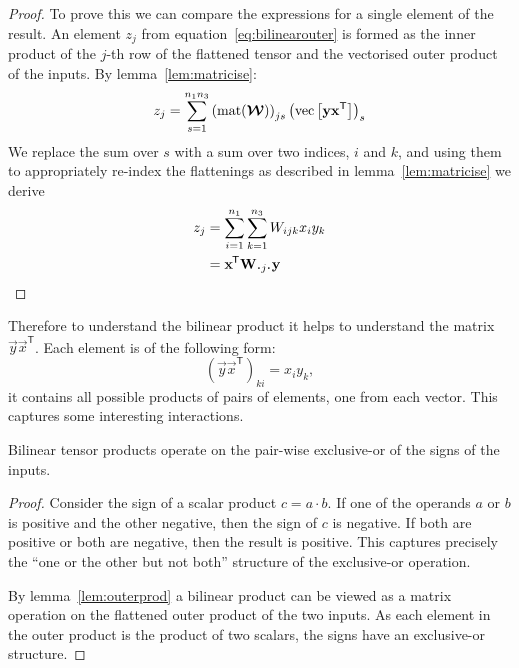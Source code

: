 {\begin{proof}
To
prove this we can compare the expressions for a single element of the result.
An element \(z_j\) from equation~\eqref{eq:bilinearouter}
is formed as the inner product of the \(j\)-th
row of the flattened tensor and the vectorised outer product of the inputs. By 
lemma~\ref{lem:matricise}:
\begin{equation}
	z_j = 
	\sum_{s=1}^{n_1n_3} \left(\operatorname{mat}(\bm{\mathcal{W}})\right)_{js} 
	\left( \operatorname{vec}\left[\mathbf{y}\mathbf{x}^\mathsf{T}\right]\right)_s
\end{equation}
We replace the sum over \(s\) with a sum over two
indices, \(i\) and \(k\), and using them to appropriately re-index the flattenings 
as described in lemma~\ref{lem:matricise} we 
derive
\begin{align}
	z_j &= \sum_{i=1}^{n_1}\sum_{k=1}^{n_3} W_{ijk} x_i y_k \\
		&= \tran{\vec{x}}\mat{W}_{\midbullet j \midbullet}\vec{y}
\end{align}

\end{proof}


Therefore to understand the bilinear product it helps to understand the matrix 
\(\vec{y}\vec{x}^\mathsf{T}\). Each element is of the following form:
\begin{equation}
	(\vec{y}\vec{x}^\mathsf{T})_{ki} = x_iy_k,
\end{equation} it contains all possible products of pairs of elements, one from each vector. 
This captures some interesting interactions.

\begin{thm}  \label{thm:xor}
Bilinear tensor products operate on the pair-wise exclusive-or of the
signs of the inputs.
\end{thm}
\begin{proof}
Consider the sign of a scalar product
\(c = a\cdot b\). If one of the operands \(a\) or \(b\) is positive and the other negative,
then the sign of \(c\) is negative. If both are positive or both are negative, then the
result is positive. This captures precisely the ``one or the other but not both'' structure
of the exclusive-or operation.

By lemma~\ref{lem:outerprod} a bilinear product can be viewed as a matrix operation on the flattened
outer product of the two inputs. As each element in the outer product is the product of two scalars,
the signs have an exclusive-or structure.
\end{proof}

}
